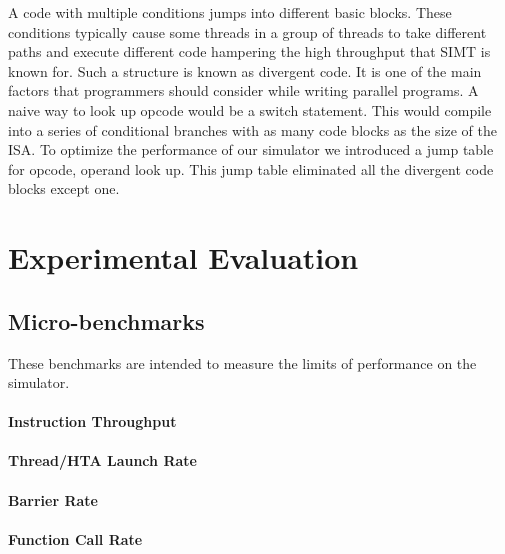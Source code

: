 \documentclass[conference, 10pt]{IEEEtran}
\begin{document}
A code with multiple conditions jumps into different basic blocks. These conditions typically 
cause some threads in a group of threads to take different paths and execute different code 
hampering the high throughput that SIMT is known for. Such a structure is known as divergent 
code. It is one of the main factors that programmers should consider while writing parallel 
programs. A naive way to look up opcode would be a switch statement. This would compile into 
a series of conditional branches with as many code blocks as the size of the ISA. To optimize 
the performance of our simulator we introduced a jump table for opcode, operand look up. This 
jump table eliminated all the divergent code blocks except one. 


\section{Experimental Evaluation}

\subsection{Micro-benchmarks}

These benchmarks are intended to measure the limits of performance on the
simulator.

\paragraph{Instruction Throughput}

\paragraph{Thread/HTA Launch Rate}

\paragraph{Barrier Rate}

\paragraph{Function Call Rate}
\end{document}
